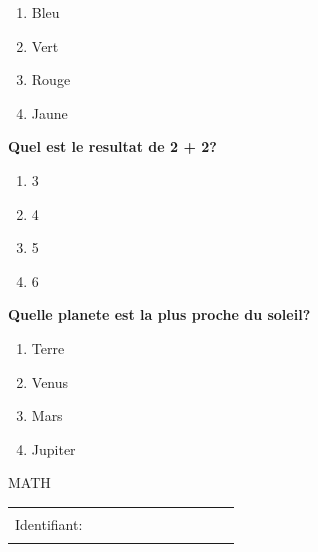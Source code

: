 \documentclass{book}%
\begin{document}
\begin{itemize}
\begin{exercise}
\begin{enumerate}[label=\textbf{\Alph*. }]
\item%
Bleu%
\item%
Vert%
\item%
Rouge%
\item%
Jaune%
\end{enumerate}%
\end{exercise}%
\begin{exercise}%
\textbf{Quel est le resultat de 2 + 2? }%
\begin{enumerate}[label=\textbf{\Alph*. }]%
\item%
3%
\item%
4%
\item%
5%
\item%
6%
\end{enumerate}%
\end{exercise}%
\begin{exercise}%
\textbf{Quelle planete est la plus proche du soleil? }%
\begin{enumerate}[label=\textbf{\Alph*. }]%
\item%
Terre%
\item%
Venus%
\item%
Mars%
\item%
Jupiter%
\end{enumerate}%
\end{exercise}%
\end{itemize}%
\newpage%
\thispagestyle{empty}%
MATH%
\begin{flushright}%
\begin{tabular}{|l|}%
\hline%
 \\%
Identifiant: $\qquad \qquad \qquad \qquad \qquad$ \\%
 \\%
\hline%
\end{tabular}%
\end{flushright}%
\end{document}
